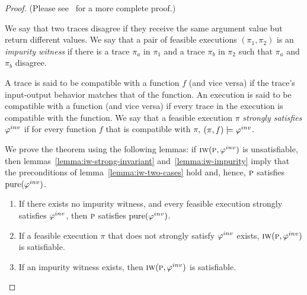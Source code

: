 \begin{proof}
(Please see~\cite{CheckingOP:arxiv} for a more complete proof.)

We say that two traces disagree if they receive the same argument value but return different values.
We say that a pair of feasible executions $(\pi_1, \pi_2)$ is an \emph{impurity witness} if there is a trace
$\pi_a$ in $\pi_1$ and a trace $\pi_b$ in $\pi_2$ such that $\pi_a$ and $\pi_b$ disagree.

A trace is said to be compatible with a function $f$ (and vice versa) if the trace's input-output behavior matches that of the function.
An execution is said to be compatible with a function (and vice versa) if every trace in the execution is compatible with the function.
We say that a feasible execution $\pi$ \emph{strongly satisfies} $\varphi^{inv}$ if for every function $f$ that is compatible with $\pi$, $(\pi,f) \models \varphi^{inv}$.

We prove the theorem using the following lemmas:
if $\textsc{iw}(\textsc{p}, \varphi^{inv})$ is unsatisfiable, then lemmas~\ref{lemma:iw-strong-invariant} and~\ref{lemma:iw-impurity} imply
that the preconditions of lemma~\ref{lemma:iw-two-cases} hold and, hence, $\textsc{p}$ satisfies $\mathrm{pure}(\varphi^{inv})$.
\begin{enumerate}
\item \label{lemma:iw-two-cases}
If there exists no impurity witness, and every feasible execution strongly satisfies $\varphi^{inv}$, then $\textsc{p}$ satisfies $\mathrm{pure}(\varphi^{inv})$.

\item \label{lemma:iw-strong-invariant}
If a feasible execution $\pi$ that does not strongly satisfy $\varphi^{inv}$ exists, $\textsc{iw}(\textsc{p}, \varphi^{inv})$ is satisfiable.

\item \label{lemma:iw-impurity}
If an impurity witness exists, then $\textsc{iw}(\textsc{p}, \varphi^{inv})$ is satisfiable.
\end{enumerate}




\end{proof}
